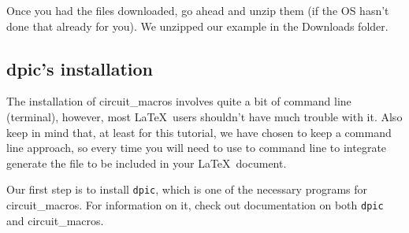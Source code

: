 \documentclass[a4paper,11pt]{article}
\begin{document}
Once you had the files downloaded, go ahead and unzip them (if the OS hasn't done that already for you). We unzipped our example in the Downloads folder.

\subsection{dpic's installation}
The installation of circuit\_macros involves quite a bit of command line (terminal), however, most \LaTeX\ users shouldn't have much trouble with it. Also keep in mind that, at least for this tutorial, we have chosen to keep a command line approach, so every time you will need to use to command line to integrate generate the file to be included in your \LaTeX\ document.

Our first step is to install \verb+dpic+, which is one of the necessary programs for circuit\_macros. For information on it, check out documentation on both \verb+dpic+ and circuit\_macros.
\end{document}
